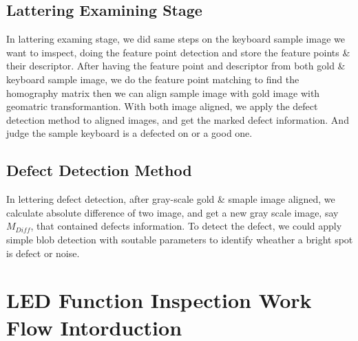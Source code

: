 	\subsection{Lattering Examining Stage}
		In lattering examing stage, we did same steps on the keyboard sample image we want to imspect, doing the feature point detection and store the feature points \& their descriptor.
		After having the feature point and descriptor from both gold \& keyboard sample image, we do the feature point matching to find the homography matrix then we can align sample image with gold image with geomatric transformantion. 
		With both image aligned, we apply the defect detection method to aligned images, and get the marked defect information.
		And judge the sample keyboard is a defected on or a good one.


	\subsection{Defect Detection Method}
		In lettering defect detection, after gray-scale gold \& smaple image aligned, we calculate absolute difference of two image, and get a new gray scale image, say $M_{Diff}$, that contained defects information.
		To detect the defect, we could apply simple blob detection with soutable parameters to identify wheather a bright spot is defect or noise.

\section{LED Function Inspection Work Flow Intorduction}
